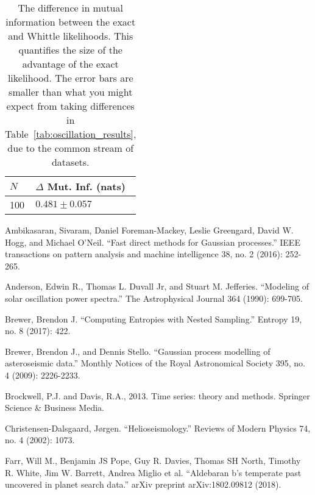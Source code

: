 \documentclass[a4paper, 12pt]{article}
\begin{document}
{\begin{table}[!ht]
\centering
\begin{tabular}{@{}l@{\hspace{3em}}l@{}}
\toprule
$N$         &       $\Delta$ Mut. Inf. (nats) \\
\hline
100         &       $0.481 \pm 0.057$ \\
\bottomrule
\end{tabular}
\caption{The difference in mutual information between the exact and
Whittle likelihoods. This quantifies the size of the advantage of the exact
likelihood.
The error bars are smaller than what you might expect from
taking differences in Table~\ref{tab:oscillation_results}, due to
the common stream of datasets.\label{tab:oscillation_differences}}
\end{table}

\begin{thebibliography}{999}

Ambikasaran, Sivaram, Daniel Foreman-Mackey, Leslie Greengard, David W. Hogg, and Michael O’Neil. ``Fast direct methods for Gaussian processes.''
IEEE transactions on pattern analysis and machine intelligence 38, no. 2 (2016): 252-265.

Anderson, Edwin R., Thomas L. Duvall Jr, and Stuart M. Jefferies. ``Modeling of solar oscillation power spectra.'' The Astrophysical Journal 364 (1990): 699-705.

Brewer, Brendon J. ``Computing Entropies with Nested Sampling.'' Entropy 19, no. 8 (2017): 422.

Brewer, Brendon J., and Dennis Stello. ``Gaussian process modelling of asteroseismic data.'' Monthly Notices of the Royal Astronomical Society 395, no. 4 
(2009): 2226-2233.

Brockwell, P.J. and Davis, R.A., 2013. Time series: theory and methods. Springer Science \& Business Media.

Christensen-Dalsgaard, Jørgen. ``Helioseismology.'' Reviews of Modern Physics 74, no. 4 (2002): 1073.

Farr, Will M., Benjamin JS Pope, Guy R. Davies, Thomas SH North, Timothy R. White, Jim W. Barrett, Andrea Miglio et al. ``Aldebaran b's temperate past uncovered in planet search data.'' arXiv preprint arXiv:1802.09812 (2018).


\end{thebibliography}}
\end{document}
